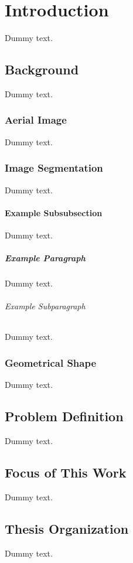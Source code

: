 \chapter{Introduction}

Dummy text.

\section{Background}

Dummy text.

\subsection{Aerial Image}

Dummy text.

\subsection{Image Segmentation}

Dummy text.

\subsubsection{Example Subsubsection}

Dummy text.

\paragraph{Example Paragraph}

Dummy text.

\subparagraph{Example Subparagraph}

Dummy text.

\subsection{Geometrical Shape}

Dummy text.

\section{Problem Definition}

Dummy text.

\section{Focus of This Work}

Dummy text.

\section{Thesis Organization}

Dummy text.

